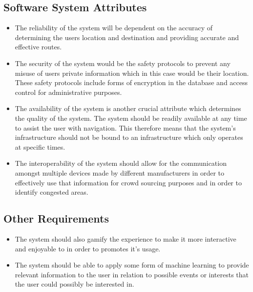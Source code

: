\documentclass[a4paper,12pt]{article}
\begin{document}
	\subsection{Software System Attributes}
		\begin{itemize}
			\small
			\item The reliability of the system will be dependent on the accuracy of determining the users location and destination and providing accurate and effective routes.
			\item The security of the system would be the safety protocols to prevent any misuse of users private information which in this case would be their location. These safety protocols include forms of encryption in the database and access control for administrative purposes.
			\item The availability of the system is another crucial attribute which determines the quality of the system. The system should be readily available at any time to assist the user with navigation. This therefore means that the system’s infrastructure should not be bound to an infrastructure which only operates at specific times.
			\item The interoperability of the system should allow for the communication amongst multiple devices made by different manufacturers in order to effectively use that information for crowd sourcing purposes and in order to identify congested areas.
		\end{itemize}	
	\subsection{Other Requirements}
		\begin{itemize}
			\small
			\item The system should also gamify the experience to make it more interactive and enjoyable to in order to promotes it’s usage.
			\item The system should be able to apply some form of machine learning to provide relevant information to the user in relation to possible events or interests that the user could possibly be interested in.
		\end{itemize}
\end{document}
